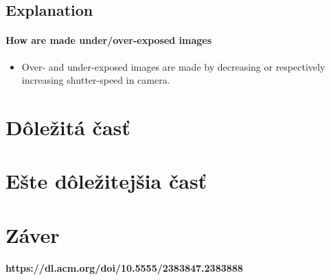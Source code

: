 \documentclass[10pt,twoside,english,a4paper]{article}
\begin{document}
\subsection{Explanation} \label{ina:este}

\paragraph{How are made under/over-exposed images}
      \begin{itemize}
		\item Over- and under-exposed images are made by decreasing 
		or respectively increasing shutter-speed in camera.
	      \end{itemize}



\section{Dôležitá časť} \label{dolezita}




\section{Ešte dôležitejšia časť} \label{dolezitejsia}




\section{Záver} \label{zaver} %





 \paragraph{https://dl.acm.org/doi/10.5555/2383847.2383888}
\end{document}
